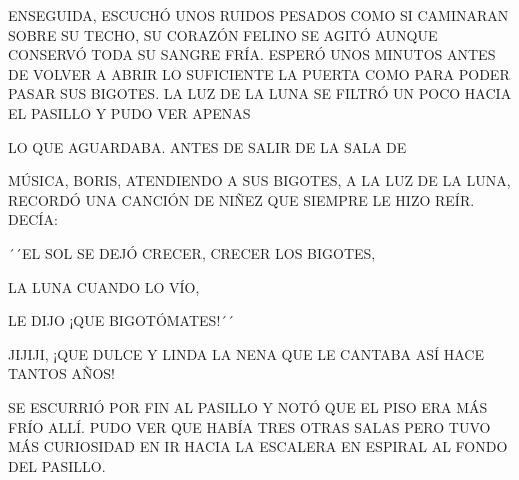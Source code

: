 ENSEGUIDA, ESCUCHÓ UNOS RUIDOS PESADOS COMO SI CAMINARAN SOBRE SU TECHO, SU CORAZÓN FELINO SE AGITÓ AUNQUE CONSERVÓ TODA SU SANGRE FRÍA. ESPERÓ UNOS MINUTOS ANTES DE VOLVER A ABRIR LO SUFICIENTE LA PUERTA COMO PARA PODER PASAR SUS BIGOTES. LA LUZ DE LA LUNA SE FILTRÓ UN POCO HACIA EL PASILLO Y PUDO VER APENAS 

\newpage
{}	
LO QUE AGUARDABA.
ANTES DE SALIR DE LA SALA 
DE 

MÚSICA, BORIS, ATENDIENDO A SUS BIGOTES, A LA LUZ DE LA LUNA, RECORDÓ UNA CANCIÓN DE NIÑEZ QUE SIEMPRE LE HIZO REÍR. DECÍA:
\begin{center}
	\begin{minipage}{.5\textwidth}
		´´EL SOL SE DEJÓ CRECER, CRECER LOS BIGOTES,
		
		LA LUNA CUANDO LO VÍO,
		
		LE DIJO ¡QUE BIGOTÓMATES!´´
	\end{minipage}
\end{center}	
JIJIJI, ¡QUE DULCE Y LINDA LA NENA  QUE LE CANTABA ASÍ HACE TANTOS AÑOS!

SE ESCURRIÓ POR FIN AL PASILLO Y NOTÓ QUE EL PISO ERA MÁS FRÍO ALLÍ. PUDO VER QUE HABÍA TRES OTRAS SALAS PERO TUVO MÁS CURIOSIDAD EN IR HACIA LA ESCALERA EN ESPIRAL AL FONDO DEL PASILLO.
